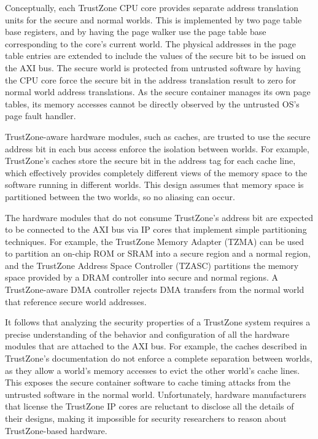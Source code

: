 Conceptually, each TrustZone CPU core provides separate address translation
units for the secure and normal worlds. This is implemented by two page table
base registers, and by having the page walker use the page table base
corresponding to the core's current world. The physical addresses in the page
table entries are extended to include the values of the secure bit to be issued
on the AXI bus. The secure world is protected from untrusted software by having
the CPU core force the secure bit in the address translation result to zero for
normal world address translations. As the secure container manages its own page
tables, its memory accesses cannot be directly observed by the untrusted OS's
page fault handler.

TrustZone-aware hardware modules, such as caches, are trusted to use the secure
address bit in each bus access enforce the isolation between worlds. For
example, TrustZone's caches store the secure bit in the address tag for each
cache line, which effectively provides completely different views of the memory
space to the software running in different worlds. This design assumes that
memory space is partitioned between the two worlds, so no aliasing can occur.

The hardware modules that do not consume TrustZone's address bit are expected
to be connected to the AXI bus via IP cores that implement simple
partitioning techniques. For example, the TrustZone Memory Adapter (TZMA) can
be used to partition an on-chip ROM or SRAM into a secure region and a normal
region, and the TrustZone Address Space Controller (TZASC) partitions the
memory space provided by a DRAM controller into secure and normal regions. A
TrustZone-aware DMA controller rejects DMA transfers from the normal world that
reference secure world addresses.

It follows that analyzing the security properties of a TrustZone system
requires a precise understanding of the behavior and configuration of all the
hardware modules that are attached to the AXI bus. For example, the caches
described in TrustZone's documentation do not enforce a complete separation
between worlds, as they allow a world's memory accesses to evict the other
world's cache lines. This exposes the secure container software to cache timing
attacks from the untrusted software in the normal world. Unfortunately,
hardware manufacturers that license the TrustZone IP cores are reluctant to
disclose all the details of their designs, making it impossible for security
researchers to reason about TrustZone-based hardware.

